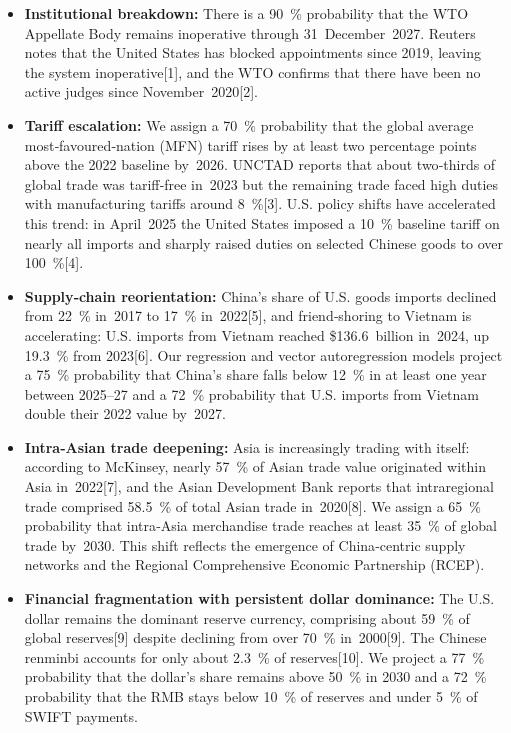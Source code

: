\documentclass[12pt]{article}
\begin{document}
\begin{itemize}
\item \textbf{Institutional breakdown:}  There is a 90~\% probability that the WTO Appellate Body remains inoperative through 31 December 2027.  Reuters notes that the United States has blocked appointments since 2019, leaving the system inoperative[1], and the WTO confirms that there have been no active judges since November 2020[2].

\item \textbf{Tariff escalation:}  We assign a 70~\% probability that the global average most‑favoured‑nation (MFN) tariff rises by at least two percentage points above the 2022 baseline by 2026.  UNCTAD reports that about two‑thirds of global trade was tariff‑free in 2023 but the remaining trade faced high duties with manufacturing tariffs around 8 \%[3].  U.S. policy shifts have accelerated this trend: in April 2025 the United States imposed a 10 \% baseline tariff on nearly all imports and sharply raised duties on selected Chinese goods to over 100 \%[4].

\item \textbf{Supply‑chain reorientation:}  China’s share of U.S. goods imports declined from 22 \% in 2017 to 17 \% in 2022[5], and friend‑shoring to Vietnam is accelerating: U.S. imports from Vietnam reached \$136.6 billion in 2024, up 19.3 \% from 2023[6].  Our regression and vector autoregression models project a 75~\% probability that China’s share falls below 12 \% in at least one year between 2025–27 and a 72 \% probability that U.S. imports from Vietnam double their 2022 value by 2027.

\item \textbf{Intra‑Asian trade deepening:}  Asia is increasingly trading with itself: according to McKinsey, nearly 57 \% of Asian trade value originated within Asia in 2022[7], and the Asian Development Bank reports that intraregional trade comprised 58.5 \% of total Asian trade in 2020[8].  We assign a 65~\% probability that intra‑Asia merchandise trade reaches at least 35 \% of global trade by 2030.  This shift reflects the emergence of China‑centric supply networks and the Regional Comprehensive Economic Partnership (RCEP).

\item \textbf{Financial fragmentation with persistent dollar dominance:}  The U.S. dollar remains the dominant reserve currency, comprising about 59 \% of global reserves[9] despite declining from over 70 \% in 2000[9].  The Chinese renminbi accounts for only about 2.3 \% of reserves[10].  We project a 77 \% probability that the dollar’s share remains above 50 \% in 2030 and a 72 \% probability that the RMB stays below 10 \% of reserves and under 5 \% of SWIFT payments.


\end{itemize}
\end{document}
